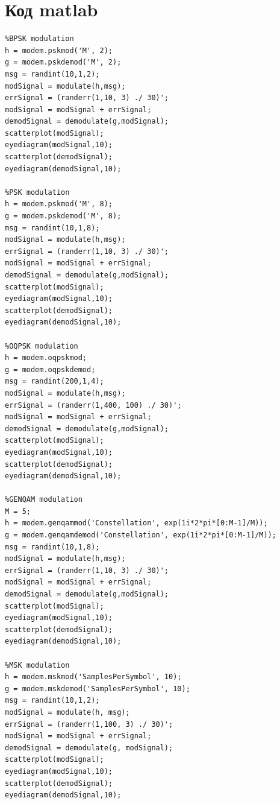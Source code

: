 \documentclass[10pt,a4paper]{report}
\begin{document}
\section{Код matlab}
\begin{verbatim}
%BPSK modulation
h = modem.pskmod('M', 2);
g = modem.pskdemod('M', 2);
msg = randint(10,1,2);
modSignal = modulate(h,msg);
errSignal = (randerr(1,10, 3) ./ 30)';
modSignal = modSignal + errSignal;
demodSignal = demodulate(g,modSignal);
scatterplot(modSignal);
eyediagram(modSignal,10);
scatterplot(demodSignal);
eyediagram(demodSignal,10);

%PSK modulation
h = modem.pskmod('M', 8);
g = modem.pskdemod('M', 8);
msg = randint(10,1,8);
modSignal = modulate(h,msg);
errSignal = (randerr(1,10, 3) ./ 30)';
modSignal = modSignal + errSignal;
demodSignal = demodulate(g,modSignal);
scatterplot(modSignal);
eyediagram(modSignal,10);
scatterplot(demodSignal);
eyediagram(demodSignal,10);

%OQPSK modulation
h = modem.oqpskmod;
g = modem.oqpskdemod;
msg = randint(200,1,4);
modSignal = modulate(h,msg);
errSignal = (randerr(1,400, 100) ./ 30)';
modSignal = modSignal + errSignal;
demodSignal = demodulate(g,modSignal);
scatterplot(modSignal);
eyediagram(modSignal,10);
scatterplot(demodSignal);
eyediagram(demodSignal,10);

%GENQAM modulation
M = 5;
h = modem.genqammod('Constellation', exp(1i*2*pi*[0:M-1]/M));
g = modem.genqamdemod('Constellation', exp(1i*2*pi*[0:M-1]/M));
msg = randint(10,1,8);
modSignal = modulate(h,msg);
errSignal = (randerr(1,10, 3) ./ 30)';
modSignal = modSignal + errSignal;
demodSignal = demodulate(g,modSignal);
scatterplot(modSignal);
eyediagram(modSignal,10);
scatterplot(demodSignal);
eyediagram(demodSignal,10);

%MSK modulation
h = modem.mskmod('SamplesPerSymbol', 10);
g = modem.mskdemod('SamplesPerSymbol', 10);
msg = randint(10,1,2);
modSignal = modulate(h, msg);
errSignal = (randerr(1,100, 3) ./ 30)';
modSignal = modSignal + errSignal;
demodSignal = demodulate(g, modSignal);
scatterplot(modSignal);
eyediagram(modSignal,10);
scatterplot(demodSignal);
eyediagram(demodSignal,10);
\end{verbatim}
\end{document}
